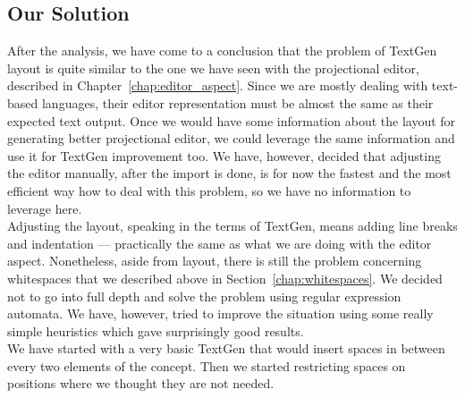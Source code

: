 \subsection{Our Solution}
\label{chap:textgen_solution}

After the analysis, we have come to a conclusion that the problem of TextGen layout is quite similar to the one we have seen with the projectional editor, described in Chapter~\ref{chap:editor_aspect}.
Since we are mostly dealing with text-based languages, their editor representation must be almost the same as their expected text output.
Once we would have some information about the layout for generating better projectional editor, we could leverage the same information and use it for TextGen improvement too.
We have, however, decided that adjusting the editor manually, after the import is done, is for now the fastest and the most efficient way how to deal with this problem, so we have no information to leverage here.
\\

Adjusting the layout, speaking in the terms of TextGen, means adding line breaks and indentation --- practically the same as what we are doing with the editor aspect.
Nonetheless, aside from layout, there is still the problem concerning whitespaces that we described above in Section~\ref{chap:whitespaces}.
We decided not to go into full depth and solve the problem using regular expression automata.
We have, however, tried to improve the situation using some really simple heuristics which gave surprisingly good results.
\\

We have started with a very basic TextGen that would insert spaces in between every two elements of the concept.
Then we started restricting spaces on positions where we thought they are not needed.

